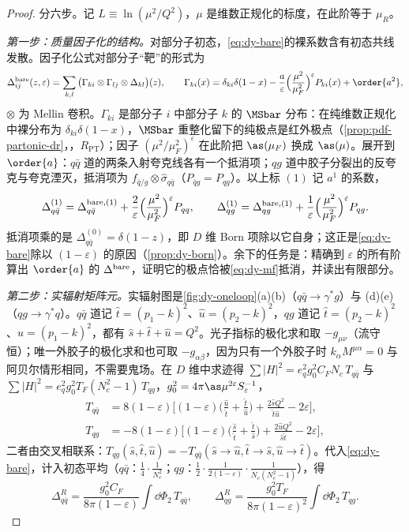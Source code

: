 \begin{proof}
分六步。记 $L\equiv\ln(\mu^2/Q^2)$，$\mu$ 是维数正规化的标度，在此阶等于 $\mu_R$。

\emph{第一步：质量因子化的结构。}对部分子初态，\cref{eq:dy-bare}的裸系数含有初态共线发散。因子化公式对部分子“靶”的形式为
\[
\Delta^{\rm bare}_{ij}(z,\varepsilon)=\sum_{k,l}\big(\Gamma_{ki}\otimes\Gamma_{lj}\otimes\Delta_{kl}\big)(z),\qquad
\Gamma_{ki}(x)=\delta_{ki}\delta(1-x)-\frac{a}{\varepsilon}\Big(\frac{\mu^2}{\mu_F^2}\Big)^{\varepsilon}P_{ki}(x)+\order{a^2},
\]
$\otimes$ 为 Mellin 卷积。$\Gamma_{ki}$ 是部分子 $i$ 中部分子 $k$ 的 $\MSbar$ 分布：在纯维数正规化中裸分布为 $\delta_{ki}\delta(1-x)$，$\MSbar$ 重整化留下的纯极点是红外极点（\cref{prop:pdf-partonic-dr}，\tagR，$R_{\mathrm{PT}}$）；因子 $(\mu^2/\mu_F^2)^\varepsilon$ 在此阶把 $\as(\mu_F)$ 换成 $\as(\mu)$。展开到 $\order{a}$：$q\bar q$ 道的两条入射夸克线各有一个抵消项；$qg$ 道中胶子分裂出的反夸克与夸克湮灭，抵消项为 $f_{\bar q/g}\otimes\hat\sigma_{q\bar q}$（$P_{\bar qg}=P_{qg}$）。以上标 $(1)$ 记 $a^1$ 的系数，
\begin{equation}\label{eq:dy-mf}
\Delta^{(1)}_{q\bar q}=\Delta^{{\rm bare},(1)}_{q\bar q}+\frac2\varepsilon\Big(\frac{\mu^2}{\mu_F^2}\Big)^{\varepsilon}P_{qq},\qquad
\Delta^{(1)}_{qg}=\Delta^{{\rm bare},(1)}_{qg}+\frac1\varepsilon\Big(\frac{\mu^2}{\mu_F^2}\Big)^{\varepsilon}P_{qg}.
\end{equation}
抵消项乘的是 $\Delta^{(0)}_{q\bar q}=\delta(1-z)$，即 $D$ 维 Born 项除以它自身；这正是\cref{eq:dy-bare}除以 $(1-\varepsilon)$ 的原因（\cref{prop:dy-born}）。余下的任务是：精确到 $\varepsilon$ 的所有阶算出 $\order{a}$ 的 $\Delta^{\rm bare}$，证明它的极点恰被\cref{eq:dy-mf}抵消，并读出有限部分。

\emph{第二步：实辐射矩阵元。}实辐射图是\cref{fig:dy-oneloop}(a)(b)（$q\bar q\to\gamma^*g$）与 (d)(e)（$qg\to\gamma^*q$）。$q\bar q$ 道记 $\hat t=(p_1-k)^2$、$\hat u=(p_2-k)^2$，$qg$ 道记 $\hat t=(p_2-k)^2$、$\hat u=(p_1-k)^2$，都有 $\hat s+\hat t+\hat u=Q^2$。光子指标的极化求和取 $-g_{\mu\nu}$（流守恒）；唯一外胶子的极化求和也可取 $-g_{\alpha\beta}$，因为只有一个外胶子时 $k_\alpha M^{\mu\alpha}=0$ 与阿贝尔情形相同，不需要鬼场。在 $D$ 维中求迹得 $\sum|H|^2=e_q^2g_0^2C_FN_c\,T_{q\bar q}$ 与 $\sum|H|^2=e_q^2g_0^2T_F(N_c^2-1)\,T_{qg}$，$g_0^2=4\pi\as\mu^{2\varepsilon}S_\varepsilon^{-1}$，
\begin{align}
T_{q\bar q}&=8(1-\varepsilon)\Big[(1-\varepsilon)\Big(\frac{\hat u}{\hat t}+\frac{\hat t}{\hat u}\Big)+\frac{2\hat sQ^2}{\hat t\hat u}-2\varepsilon\Big],\label{eq:dy-Tqq}\\
T_{qg}&=-8(1-\varepsilon)\Big[(1-\varepsilon)\Big(\frac{\hat s}{\hat t}+\frac{\hat t}{\hat s}\Big)+\frac{2\hat uQ^2}{\hat s\hat t}-2\varepsilon\Big],\label{eq:dy-Tqg}
\end{align}
二者由交叉相联系：$T_{qg}(\hat s,\hat t,\hat u)=-T_{q\bar q}(\hat s\to\hat u,\hat t\to\hat s,\hat u\to\hat t)$。代入\cref{eq:dy-bare}，计入初态平均（$q\bar q$：$\frac14\cdot\frac1{N_c^2}$；$qg$：$\frac12\cdot\frac{1}{2(1-\varepsilon)}\cdot\frac{1}{N_c(N_c^2-1)}$），得
\[
\Delta^R_{q\bar q}=\frac{g_0^2C_F}{8\pi(1-\varepsilon)}\int\dd\Phi_2\,T_{q\bar q},\qquad
\Delta^R_{qg}=\frac{g_0^2T_F}{8\pi(1-\varepsilon)^2}\int\dd\Phi_2\,T_{qg}.
\]


\end{proof}
